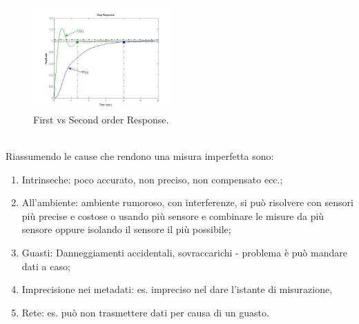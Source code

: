 \documentclass[11pt, twocolumn]{article}
\newenvironment{myenumerate}
{ \begin{enumerate}[topsep=0ex]
		\setlength{\itemsep}{0pt}
		\setlength{\parskip}{0pt}
		\setlength{\parsep}{0pt}     }
	{ \end{enumerate}                  }
\begin{document}
\begin{figure}[!h]
  \centering
  \includegraphics[width=\linewidth,height=4cm]{imgs/first_sec.jpg}
  \caption{First vs Second order Response.}
  \label{fig:First_sec}
\end{figure}\\
Riassumendo le cause che rendono una misura imperfetta sono:
\begin{myenumerate}
  \item Intrinseche: poco accurato, non preciso, non compensato ecc.;
  \item All'ambiente: ambiente rumoroso, con interferenze, si può risolvere con sensori più precise e costose o usando più sensore e combinare le misure da più sensore oppure isolando il sensore il più possibile;
  \item Guasti: Danneggiamenti accidentali, sovraccarichi - problema è può mandare dati a caso;
  \item Imprecisione nei metadati: es. impreciso nel dare l'istante di misurazione, 
  \item Rete: es. può non trasmettere dati per causa di un guasto.
\end{myenumerate}
\end{document}
